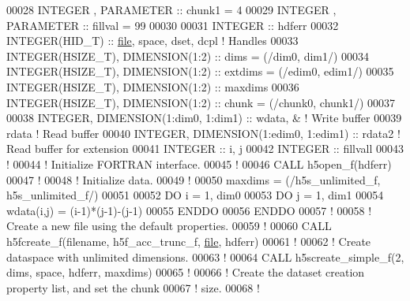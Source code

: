 \begin{DoxyCode}
00028   \textcolor{keywordtype}{INTEGER}          , \textcolor{keywordtype}{PARAMETER} :: chunk1   = 4
00029   \textcolor{keywordtype}{INTEGER}          , \textcolor{keywordtype}{PARAMETER} :: fillval  = 99
00030 
00031   \textcolor{keywordtype}{INTEGER} :: hdferr
00032   \textcolor{keywordtype}{INTEGER(HID\_T)}  :: \hyperlink{structfile}{file}, space, dset, dcpl \textcolor{comment}{! Handles}
00033   \textcolor{keywordtype}{INTEGER(HSIZE\_T)}, \textcolor{keywordtype}{DIMENSION(1:2)} :: dims    = (/dim0, dim1/)
00034   \textcolor{keywordtype}{INTEGER(HSIZE\_T)}, \textcolor{keywordtype}{DIMENSION(1:2)} :: extdims = (/edim0, edim1/)
00035   \textcolor{keywordtype}{INTEGER(HSIZE\_T)}, \textcolor{keywordtype}{DIMENSION(1:2)} :: maxdims
00036   \textcolor{keywordtype}{INTEGER(HSIZE\_T)}, \textcolor{keywordtype}{DIMENSION(1:2)} :: chunk   = (/chunk0, chunk1/)
00037 
00038   \textcolor{keywordtype}{INTEGER}, \textcolor{keywordtype}{DIMENSION(1:dim0, 1:dim1)}   :: wdata, & \textcolor{comment}{! Write buffer }
00039                                           rdata    \textcolor{comment}{! Read buffer}
00040   \textcolor{keywordtype}{INTEGER}, \textcolor{keywordtype}{DIMENSION(1:edim0, 1:edim1)} :: rdata2   \textcolor{comment}{! Read buffer for extension}
00041   \textcolor{keywordtype}{INTEGER} :: i, j
00042   \textcolor{keywordtype}{INTEGER} :: fillvall
00043   \textcolor{comment}{!}
00044   \textcolor{comment}{! Initialize FORTRAN interface.}
00045   \textcolor{comment}{!}
00046   \textcolor{keyword}{CALL }h5open\_f(hdferr)
00047   \textcolor{comment}{!}
00048   \textcolor{comment}{! Initialize data.}
00049   \textcolor{comment}{!}
00050   maxdims = (/h5s\_unlimited\_f, h5s\_unlimited\_f/)
00051 
00052   \textcolor{keywordflow}{DO} i = 1, dim0
00053      \textcolor{keywordflow}{DO} j = 1, dim1
00054         wdata(i,j) = (i-1)*(j-1)-(j-1)
00055 \textcolor{keywordflow}{     ENDDO}
00056 \textcolor{keywordflow}{  ENDDO}
00057   \textcolor{comment}{!}
00058   \textcolor{comment}{! Create a new file using the default properties.}
00059   \textcolor{comment}{!}
00060   \textcolor{keyword}{CALL }h5fcreate\_f(filename, h5f\_acc\_trunc\_f, \hyperlink{structfile}{file}, hdferr)
00061   \textcolor{comment}{!}
00062   \textcolor{comment}{! Create dataspace with unlimited dimensions.}
00063   \textcolor{comment}{!}
00064   \textcolor{keyword}{CALL }h5screate\_simple\_f(2, dims, space, hdferr, maxdims)
00065   \textcolor{comment}{!  }
00066   \textcolor{comment}{! Create the dataset creation property list, and set the chunk}
00067   \textcolor{comment}{! size.}
00068   \textcolor{comment}{!}

\end{DoxyCode}

